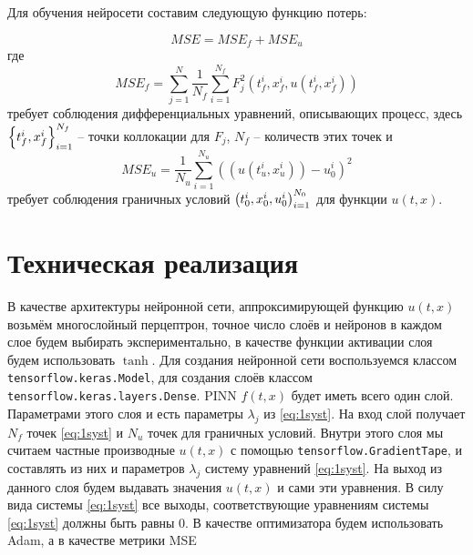 \documentclass[a4paper,14pt]{extarticle} %
\begin{document}
Для обучения нейросети составим следующую функцию потерь:

\begin{equation}
    MSE = MSE_f + MSE_u
\end{equation}
где
\begin{equation}
    MSE_f = \sum_{j=1}^N\frac{1}{N_f}\sum_{i=1}^{N_f} F_j^2(t^i_f, x^i_f, u(t^i_f, x^i_f))
\end{equation}
требует соблюдения дифференциальных уравнений, описывающих процесс, здесь ${\left\{ t^i_f, x^i_f \right\}}_{i=1}^{N_f}$ -- точки коллокации для $F_j$, $N_f$ -- количеств этих точек и
\begin{equation}
    MSE_u = \frac{1}{N_u}\sum_{i=1}^{N_u} ((u(t^i_u, x^i_u)) - u^i_0)^2
\end{equation}
требует соблюдения граничных условий ${\left( t^i_0, x^i_0, u^i_0 \right)}_{i=1}^{N_0}$ для функции $u(t,x)$.

\newpage
\section{Техническая реализация}

В качестве архитектуры нейронной сети, аппроксимирующей функцию $u(t,x)$ возьмём многослойный перцептрон, точное число слоёв и нейронов в каждом слое будем выбирать экспериментально, в качестве функции активации слоя будем использовать $\tanh$. Для создания нейронной сети воспользуемся классом \texttt{tensorflow.keras.Model}, для создания слоёв классом \texttt{tensorflow.keras.layers.Dense}. PINN $f(t, x)$ будет иметь всего один слой. Параметрами этого слоя и есть параметры $\lambda_j$ из \ref{eq:1syst}. На вход слой получает $N_f$ точек \ref{eq:1syst} и $N_u$ точек для граничных условий. Внутри этого слоя мы считаем частные производные $u(t,x)$ с помощью \texttt{tensorflow.GradientTape}, и составлять из них и параметров $\lambda_j$ систему уравнений \ref{eq:1syst}. На выход из данного слоя будем выдавать значения $u(t,x)$ и сами эти уравнения. В силу вида системы \ref{eq:1syst} все выходы, соответствующие уравнениям системы \ref{eq:1syst} должны быть равны 0. В качестве оптимизатора будем использовать Adam, а в качестве метрики MSE

\end{document}
